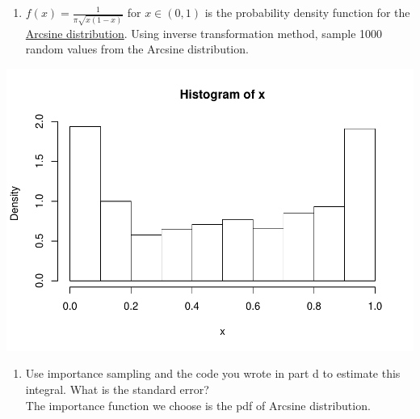 \documentclass[
]{article}
\providecommand{\tightlist}{%
  \setlength{\itemsep}{0pt}\setlength{\parskip}{0pt}}
\begin{document}
\begin{enumerate}
\def\labelenumi{\alph{enumi}.}
\setcounter{enumi}{3}
\tightlist
\item
  \(f(x)=\frac{1}{\pi\sqrt{x(1-x)}}\) for \(x\in(0,1)\) is the
  probability density function for the
  \href{https://en.wikipedia.org/wiki/Arcsine_distribution}{Arcsine
  distribution}. Using inverse transformation method, sample 1000 random
  values from the Arcsine distribution.
\end{enumerate}

\includegraphics{hw04_yutingd3_files/figure-latex/unnamed-chunk-3-1.pdf}

\begin{enumerate}
\def\labelenumi{\alph{enumi}.}
\setcounter{enumi}{4}
\tightlist
\item
  Use importance sampling and the code you wrote in part d to estimate
  this integral. What is the standard error?\\
  The importance function we choose is the pdf of Arcsine distribution.
\end{enumerate}
\end{document}
